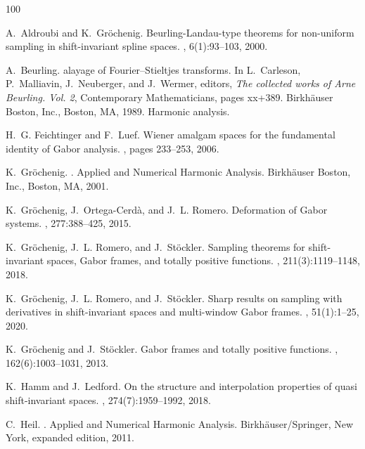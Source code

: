 \documentclass[12pt]{amsart}
\numberwithin{equation}{section}
\begin{document}
\begin{thebibliography}{100}

A.~Aldroubi and K.~Gr\"{o}chenig.
\newblock Beurling-{L}andau-type theorems for non-uniform sampling in shift-invariant spline spaces.
, 6(1):93--103, 2000.

A.~Beurling.
alayage of {F}ourier--{S}tieltjes transforms.
\newblock In L.~Carleson, P.~Malliavin, J.~Neuberger, and J.~Wermer, editors, {\em The collected works of {A}rne {B}eurling. {V}ol. 2}, Contemporary Mathematicians, pages xx+389. Birkh\"{a}user Boston, Inc., Boston, MA, 1989.
\newblock Harmonic analysis.

H.~G. Feichtinger and F.~Luef.
\newblock Wiener amalgam spaces for the fundamental identity of {G}abor analysis.
, pages 233--253, 2006.

K.~Gr\"ochenig.
.
\newblock Applied and Numerical Harmonic Analysis. Birkh\"auser Boston, Inc., Boston, MA, 2001.

K.~Gr\"{o}chenig, J.~Ortega-Cerd\`a, and J.~L. Romero.
\newblock Deformation of {G}abor systems.
, 277:388--425, 2015.

K.~Gr\"{o}chenig, J.~L. Romero, and J.~St\"{o}ckler.
\newblock Sampling theorems for shift-invariant spaces, {G}abor frames, and totally positive functions.
, 211(3):1119--1148, 2018.

K.~Gr\"ochenig, J.~L. Romero, and J.~St\"ockler.
\newblock Sharp results on sampling with derivatives in shift-invariant spaces and multi-window {G}abor frames.
, 51(1):1--25, 2020.

K.~Gr\"{o}chenig and J.~St\"{o}ckler.
\newblock Gabor frames and totally positive functions.
, 162(6):1003--1031, 2013.

K.~Hamm and J.~Ledford.
\newblock On the structure and interpolation properties of quasi shift-invariant spaces.
, 274(7):1959--1992, 2018.

C.~Heil.
.
\newblock Applied and Numerical Harmonic Analysis. Birkh\"{a}user/Springer, New York, expanded edition, 2011.


\end{thebibliography}
\end{document}
